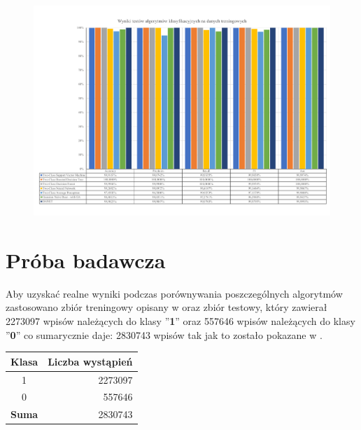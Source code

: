 \begin{landscape}
    \vspace*{\fill}
    \begin{figure}[H]
        \centering
        \includegraphics[height=0.8\textwidth]{images/predict_same}
        \label{fig:predict-same}
    \end{figure}
\vfill

\end{landscape}

\section{Próba badawcza}
Aby uzyskać realne wyniki podczas porównywania poszczególnych algorytmów zastosowano zbiór treningowy opisany w  oraz zbiór testowy, który zawierał 2273097 wpisów należących do klasy ''\textbf{1}'' oraz 557646 wpisów należących do klasy ''\textbf{0}'' co sumarycznie daje: 2830743 wpisów tak jak to zostało pokazane w .

\begin{table}[H]
    \centering
    \label{tab:res-test}
    \begin{tabular}{|c|r|} \hline
        \textbf{Klasa} & \textbf{Liczba wystąpień} \\ \hline
        1 & 2273097 \\ \hline
        0 & 557646 \\ \hline
        \textbf{Suma} & 2830743 \\ \hline
    \end{tabular}
\end{table}

